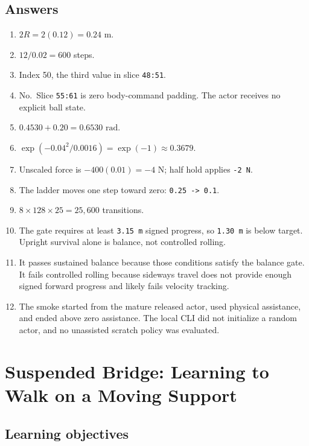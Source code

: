 \documentclass[
  american,
  11pt,
  letterpaper,
]{article}
\providecommand{\tightlist}{%
  \setlength{\itemsep}{0pt}\setlength{\parskip}{0pt}}
\begin{document}
\subsection{Answers}\label{answers-1}

\begin{enumerate}
\def\labelenumi{\arabic{enumi}.}
\tightlist
\item
  \(2R=2(0.12)=0.24\text{ m}\).
\item
  \(12/0.02=600\) steps.
\item
  Index 50, the third value in slice \texttt{48:51}.
\item
  No.~Slice \texttt{55:61} is zero body-command padding. The actor
  receives no explicit ball state.
\item
  \(0.4530+0.20=0.6530\text{ rad}\).
\item
  \(\exp(-0.04^2/0.0016)=\exp(-1)\approx0.3679\).
\item
  Unscaled force is \(-400(0.01)=-4\text{ N}\); half hold applies
  \texttt{-2\ N}.
\item
  The ladder moves one step toward zero:
  \texttt{0.25\ -\textgreater{}\ 0.1}.
\item
  \(8\times128\times25=25{,}600\) transitions.
\item
  The gate requires at least \texttt{3.15\ m} signed progress, so
  \texttt{1.30\ m} is below target. Upright survival alone is balance,
  not controlled rolling.
\item
  It passes sustained balance because those conditions satisfy the
  balance gate. It fails controlled rolling because sideways travel does
  not provide enough signed forward progress and likely fails velocity
  tracking.
\item
  The smoke started from the mature released actor, used physical
  assistance, and ended above zero assistance. The local CLI did not
  initialize a random actor, and no unassisted scratch policy was
  evaluated.
\end{enumerate}

\section{Suspended Bridge: Learning to Walk on a Moving
Support}\label{suspended-bridge-learning-to-walk-on-a-moving-support}

\subsection{Learning objectives}\label{learning-objectives-1}
\end{document}
